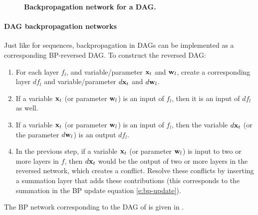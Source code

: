 \begin{figure}[H]
\begin{center}
	\end{center}
	\vspace{-1em}
	\caption{\textbf{Backpropagation network for a DAG.}}\label{f:dagbp}
\end{figure}

\paragraph{DAG backpropagation networks}\label{s:bpnets-dag}

Just like for sequences, backpropagation in DAGs can be implemented as a corresponding BP-reversed DAG. To construct the reversed DAG:
\begin{enumerate}
	\item For each layer $f_l$, and variable/parameter $\mathbf{x}_t$ and $\mathbf{w}_l$, create a corresponding layer $df_l$ and variable/parameter $d\mathbf{x}_t$ and $d\mathbf{w}_l$.
	\item If a variable $\mathbf{x}_t$ (or parameter $\mathbf{w}_l$) is an input of $f_l$, then it is an input of $df_l$ as well.
	\item If a variable $\mathbf{x}_t$ (or parameter $\mathbf{w}_l$) is an input of $f_l$, then the variable $d\mathbf{x}_t$ (or the parameter $d\mathbf{w}_l$) is an output $df_l$.
	\item In the previous step, if a variable $\mathbf{x}_t$ (or parameter $\mathbf{w}_l$) is input to two or more layers in $f$, then $d\mathbf{x}_t$ would be the output of two or more layers in the reversed network, which creates a conflict. Resolve these conflicts by inserting a summation layer that adds these contributions (this corresponds to the summation in the BP update equation \eqref{e:bp-update}).
\end{enumerate}
The BP network corresponding to the DAG of  is given in .


